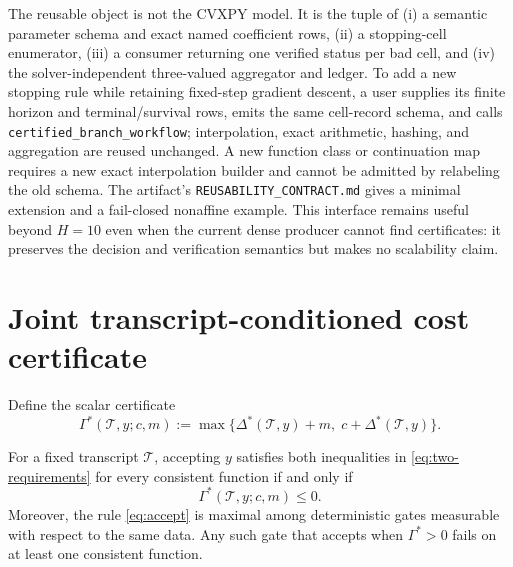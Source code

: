 \documentclass[smallextended]{svjour3}
\newcommand{\cT}{\mathcal{T}}
\begin{document}
The reusable object is not the CVXPY model.  It is the tuple of (i) a semantic
parameter schema and exact named coefficient rows, (ii) a stopping-cell
enumerator, (iii) a consumer returning one verified status per bad cell, and
(iv) the solver-independent three-valued aggregator and ledger.  To add a new
stopping rule while retaining fixed-step gradient descent, a user supplies its
finite horizon and terminal/survival rows, emits the same cell-record schema,
and calls \texttt{certified\_branch\_workflow}; interpolation, exact arithmetic,
hashing, and aggregation are reused unchanged.  A new function class or
continuation map requires a new exact interpolation builder and cannot be
admitted by relabeling the old schema.  The artifact's
\texttt{REUSABILITY\_CONTRACT.md} gives a minimal extension and a fail-closed
nonaffine example.  This interface remains useful beyond $H=10$ even when the
current dense producer cannot find certificates: it preserves the decision and
verification semantics but makes no scalability claim.

\section{Joint transcript-conditioned cost certificate}
\label{sec:optimal-gate}

Define the scalar certificate
\begin{equation}
 \Gamma^*(\cT,y;c,m)
 :=\max\{\Delta^*(\cT,y)+m,\;c+\Delta^*(\cT,y)\}.
 \label{eq:gamma}
\end{equation}

\begin{theorem}
\label{thm:maximal-gate}
For a fixed transcript $\cT$, accepting $y$ satisfies both inequalities in
\eqref{eq:two-requirements} for every consistent function if and only if
\begin{equation}
 \Gamma^*(\cT,y;c,m)\leq0.                         \label{eq:accept}
\end{equation}
Moreover, the rule \eqref{eq:accept} is maximal among deterministic gates
measurable with respect to the same data.  Any such gate that accepts when
$\Gamma^*>0$ fails on at least one consistent function.
\end{theorem}
\end{document}

